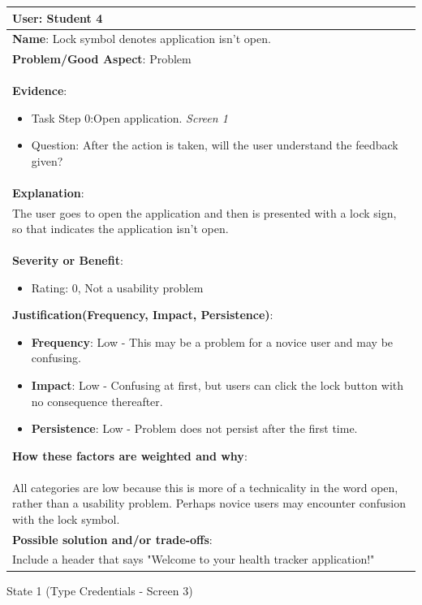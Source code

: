 \documentclass[pdftex,12pt,a4paper]{report}
\begin{document}
\begin{center}
	\begin{tabular}{|p{\textwidth}|}
	\hline
	\textbf{User}: Student 4\\
	\hline
	\textbf{Name}: Lock symbol denotes application isn't open.\\
	\hline
	\textbf{Problem/Good Aspect}: Problem\\
	\hline
	\textbf{Evidence}:
	\begin{itemize}
	\item{Task Step 0:Open application.  \textit{Screen 1}}
	\item{Question: After the action is taken, will the user understand the feedback given?}
	\end{itemize}\\
	\hline
	\textbf{Explanation}:\\
	The user goes to open the application and then is presented with a lock sign, so that indicates the application isn't open. \\
	\hline
	\textbf{Severity or Benefit}:
	\begin{itemize}
	\item{Rating: 0, Not a usability problem}
	\end{itemize}
	\textbf{Justification(Frequency, Impact, Persistence)}:
	\begin{itemize}
	\item{\textbf{Frequency}:} Low - This may be a problem for a novice user and may be confusing.
	\item{\textbf{Impact}:} Low - Confusing at first, but users can click the lock button with no consequence thereafter.
	\item{\textbf{Persistence}:} Low - Problem does not persist after the first time.
	\end{itemize}
	\textbf{How these factors are weighted and why}:\\
	All categories are low because this is more of a technicality in the word open, rather than a usability problem. Perhaps novice users may encounter confusion with the lock symbol.\\
	\hline
	\textbf{Possible solution and/or trade-offs}:\\
	Include a header that says "Welcome to your health tracker application!"\\
	\hline
	\end{tabular}
\end{center}

\begin{center}
State 1 (Type Credentials - Screen 3)
\end{center}
\end{document}
